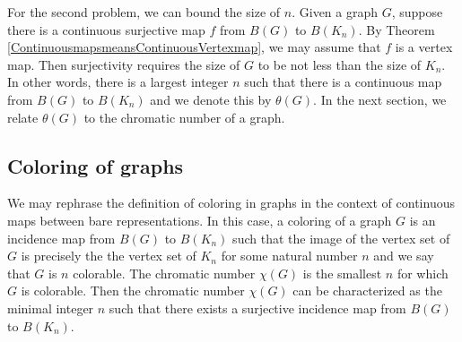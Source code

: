 \documentclass{amsart}
\theoremstyle{definition}
\theoremstyle{remark}
\numberwithin{equation}{section}
\begin{document}
	For the second problem, we can bound the size of \(n\). Given a graph \(G\), suppose there is a continuous surjective map \(f\) from \(B(G)\) to \(B(K_n)\). By Theorem \ref{ContinuousmapsmeansContinuousVertexmap}, we may assume that \(f\) is a vertex map. Then surjectivity requires the size of \(G\) to be not less than the size of \(K_n\). In other words, there is a largest integer \(n\) such that there is a continuous map from \(B(G)\) to \(B(K_n)\) and we denote this by \(\theta(G)\). In the next section, we relate \(\theta(G)\) to the chromatic number of a graph.
	
	\subsection{Coloring of graphs}
	
	We may rephrase the definition of coloring in graphs in the context of continuous maps between bare representations. In this case, a coloring of a graph \(G\) is an incidence map from \(B(G)\) to \(B(K_n)\) such that the image of the vertex set of \(G\) is precisely the the vertex set of \(K_n\) for some natural number \(n\) and we say that \(G\) is \(n\) colorable. The chromatic number \(\chi(G)\) is the smallest \(n\) for which \(G\) is colorable. Then the chromatic number \( \chi(G) \) can be characterized as the minimal integer \( n \) such that there exists a surjective incidence map from \( B(G) \) to \( B(K_n) \).
	
\end{document}
